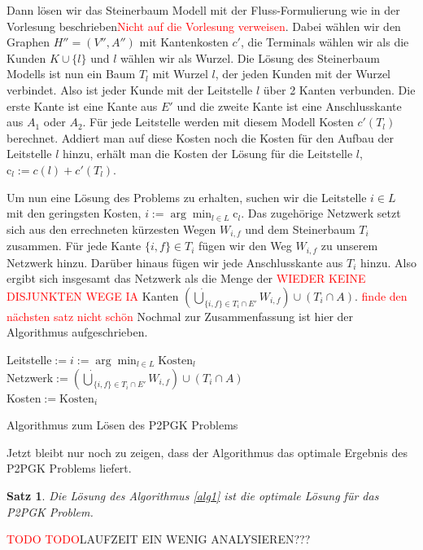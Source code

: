 \documentclass[11pt,a4paper]{article}
\makeatletter
\newcommand{\TODO}{\textcolor{red}{TODO}}
\theoremstyle{my_th_style1}
\newtheorem{satz}{Satz}
\renewenvironment{proof}[1][\proofname]{\par 
	\pushQED{\qed}%
	\normalfont \topsep6\p@\@plus6\p@\relax 
	\trivlist 
	\item[\hskip\labelsep 
	\bfseries 
	#1\@addpunct{:}]\ignorespaces 
}{%
\popQED\endtrivlist\@endpefalse 
}
\makeatother
\begin{document}
Dann lösen wir das Steinerbaum Modell mit der Fluss-Formulierung wie in der Vorlesung beschrieben\textcolor{red}{Nicht auf die Vorlesung verweisen}. Dabei wählen wir den Graphen $H''=(V'',A'')$ mit Kantenkosten $c'$, die Terminals wählen wir als die Kunden $K \cup \{l\}$ und $l$ w\"ahlen wir als Wurzel. Die Lösung des Steinerbaum Modells ist nun ein Baum $T_l$ mit Wurzel $l$, der jeden Kunden mit der Wurzel verbindet. Also ist jeder Kunde mit der Leitstelle $l$ über 2 Kanten verbunden. Die erste Kante ist eine Kante aus $E'$ und die zweite Kante ist eine Anschlusskante aus $A_1$ oder $A_2$. Für jede Leitstelle werden mit diesem Modell Kosten $c'(T_l)$ berechnet. Addiert man auf diese Kosten noch die Kosten für den Aufbau der Leitstelle $l$ hinzu, erhält man die Kosten der Lösung für die Leitstelle \(l\), $\text{c}_l:=c(l)+c'(T_l)$.

Um nun eine Lösung des Problems zu erhalten, suchen wir die Leitstelle $i \in L$ mit den geringsten Kosten, $i:=\arg \displaystyle\min_{l \in L} \text{c}_l$. Das zugehörige Netzwerk setzt sich aus den errechneten kürzesten Wegen  $W_{i,f}$ und dem Steinerbaum $T_i$ zusammen. Für jede Kante $\{i,f\} \in T_i$ fügen wir den Weg $W_{i,f}$ zu unserem Netzwerk hinzu. Darüber hinaus fügen wir jede Anschlusskante aus $T_i$ hinzu. Also ergibt sich insgesamt das Netzwerk als die Menge der \textcolor{red}{WIEDER KEINE DISJUNKTEN WEGE IA} Kanten $(\dot{\bigcup}_{\{i,f\} \in T_i \cap E'}W_{i,f}) \cup (T_i\cap A)$.
\textcolor{red}{finde den n\"achsten satz nicht sch\"on}
Nochmal zur Zusammenfassung ist hier der Algorithmus aufgeschrieben.

\vspace{0.5cm}
\begin{algorithm}[H]
	\label{alg1}
\BlankLine

	Leitstelle$:=i:=\arg \displaystyle\min_{l \in L} \text{Kosten}_l$\\
	Netzwerk$:=(\dot{\bigcup}_{\{i,f\} \in T_i \cap E'}W_{i,f}) \cup (T_i\cap A)$\\
	Kosten$:=\text{Kosten}_{i}$
	\BlankLine
\caption{Algorithmus zum Lösen des P2PGK Problems}
\end{algorithm}
\vspace{0.5cm}
Jetzt bleibt nur noch zu zeigen, dass der Algorithmus das optimale Ergebnis des P2PGK Problems liefert.
\begin{satz}
	Die Lösung des Algorithmus \ref{alg1} ist die optimale Lösung für das P2PGK Problem.
\end{satz}
\begin{proof}
	\TODO
\end{proof}
\TODO LAUFZEIT EIN WENIG ANALYSIEREN???
\end{document}
